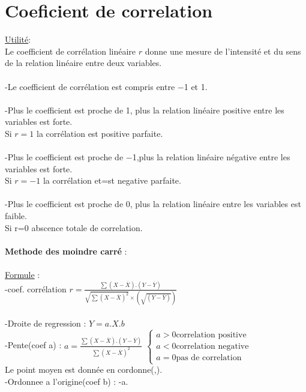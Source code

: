 \documentclass[a4paper,8pt,openany]{book}
\begin{document}
\section{Coeficient de correlation}

\underline{Utilité}:\\Le coefficient de corr\'elation lin\'eaire $r$ donne une mesure de l'intensit\'e et du sens de la relation lin\'eaire entre deux variables.\\
\\
-Le coefficient de corr\'elation est compris entre −1 et 1.\\
\\
-Plus le coefficient est proche de 1, plus la relation lin\'eaire positive entre les variables est forte.\\
Si $r=1$ la corr\'elation est positive parfaite.\\
\\
-Plus le coefficient est proche de −1,plus la relation lin\'eaire négative entre les variables est forte.\\
Si $r=-1$ la corr\'elation et=st negative parfaite.\\
\\
-Plus le coefficient est proche de 0, plus la relation lin\'eaire entre les variables est faible.\\
Si r=0 abscence totale de correlation.\\
\\
\textbf{Methode des moindre carr\'e} : \\
\\
\underline{Formule} : \\
-coef. corr\'elation $r=\frac{\sum(X-\overline{X}).(Y-\overline{Y})}{\sqrt{\sum(X-\overline{X})^2}\times (\sqrt{(Y-\overline{Y})})}$\\
\\
-Droite de regression : $Y=a.X.b$\\
-Pente(coef a) : $a=\frac{\sum(X-\overline{X}).(Y-\overline{Y})}{\sum(X-\overline{X})^2}$ 
$\left\{
\begin{array}{l}
  a>0 \text{correlation positive} \\
  a<0 \text{correlation negative} \\
  a=0 \text{pas de correlation}
\end{array}
\right.$
\\
Le point moyen est donnée en cordonne(,).\\

-Ordonnee a l'origine(coef b) : -a.\\
\end{document}
